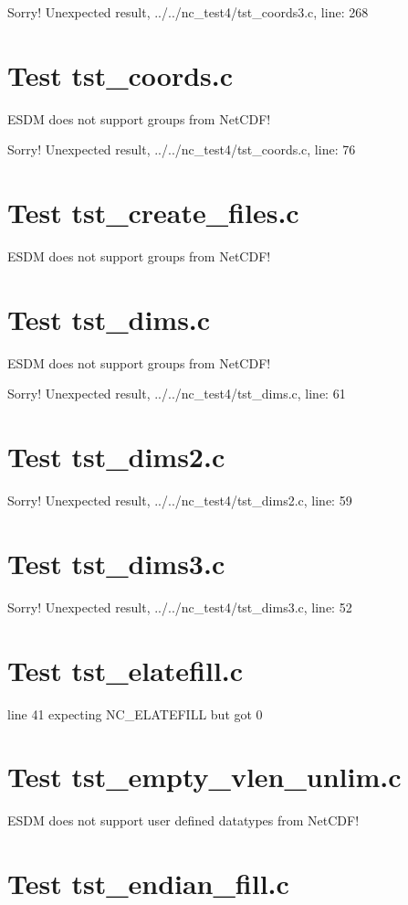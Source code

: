 Sorry! Unexpected result, ../../nc\_test4/tst\_coords3.c, line: 268

\section{Test tst\_coords.c}

ESDM does not support groups from NetCDF!

Sorry! Unexpected result, ../../nc\_test4/tst\_coords.c, line: 76

\section{Test tst\_create\_files.c}

ESDM does not support groups from NetCDF!

\section{Test tst\_dims.c}

ESDM does not support groups from NetCDF!

Sorry! Unexpected result, ../../nc\_test4/tst\_dims.c, line: 61

\section{Test tst\_dims2.c}

Sorry! Unexpected result, ../../nc\_test4/tst\_dims2.c, line: 59

\section{Test tst\_dims3.c}

Sorry! Unexpected result, ../../nc\_test4/tst\_dims3.c, line: 52

\section{Test tst\_elatefill.c}

line 41 expecting NC\_ELATEFILL but got 0

\section{Test tst\_empty\_vlen\_unlim.c}

ESDM does not support user defined datatypes from NetCDF!

\section{Test tst\_endian\_fill.c}

